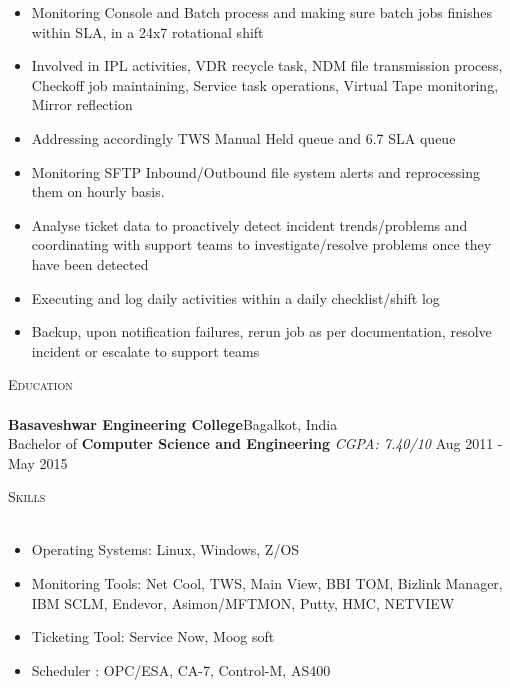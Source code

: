 \documentclass[a4paper]{article}
\newcommand{\lineunder} {
    \vspace*{-8pt} \\
    \hspace*{-18pt} \hrulefill \\
}
\newcommand{\header} [1] {
    {\hspace*{-18pt}\vspace*{6pt} \textsc{#1}}
    \vspace*{-6pt} \lineunder
}
\begin{document}
\begin{itemize} \itemsep 1pt
          \item Monitoring Console and Batch process and making sure batch jobs finishes within SLA, in a 24x7 rotational shift
	\item Involved in  IPL activities, VDR recycle task, NDM file transmission process, Checkoff job maintaining, Service task operations, Virtual Tape monitoring, Mirror reflection
	\item Addressing accordingly TWS Manual Held queue and 6.7 SLA queue
           \item Monitoring SFTP Inbound/Outbound file system alerts and reprocessing them on hourly basis.
	\item Analyse ticket data to proactively detect incident trends/problems and coordinating with support teams to investigate/resolve problems once they have been detected
	\item Executing and log daily activities within a daily checklist/shift log
           \item Backup, upon notification failures, rerun job as per documentation, resolve incident or escalate to support teams
\end{itemize}

\vspace{2mm}


{\color{blue}\header{Education}}
\vspace{1mm}
\textbf{Basaveshwar Engineering College}\hfill Bagalkot, India\\
Bachelor of \textbf{Computer Science and Engineering} \textit{CGPA: 7.40/10} \hfill Aug 2011 - May 2015\\
\vspace{2mm}


{\color{blue}\header{Skills}}
\vspace{1mm}
\justify
\begin{itemize} \itemsep 1pt
	\item Operating Systems: Linux, Windows, Z/OS \\
	\item Monitoring Tools: Net Cool, TWS, Main View, BBI TOM, Bizlink Manager, IBM SCLM, Endevor, Asimon/MFTMON, Putty, HMC, NETVIEW \\
           \item Ticketing Tool: Service Now, Moog soft \\
           \item Scheduler : OPC/ESA, CA-7, Control-M, AS400
\end{itemize}
\vspace{2mm}
\end{document}
